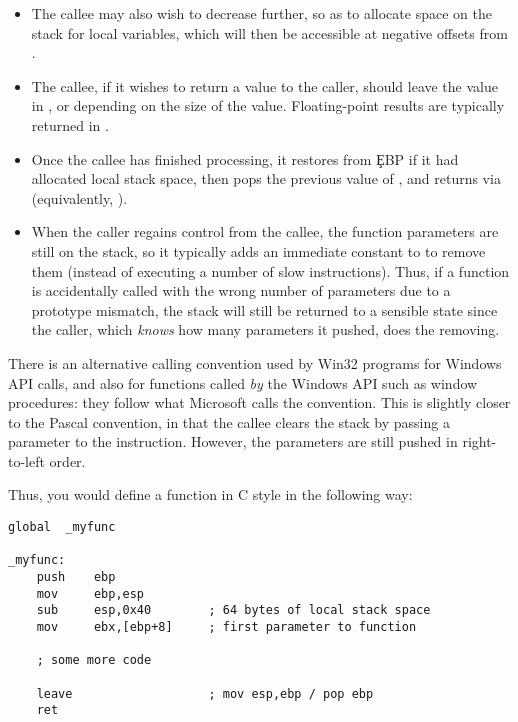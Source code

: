 \begin{itemize}
    \item{The callee may also wish to decrease  further, so as
        to allocate space on the stack for local variables, which will
        then be accessible at negative offsets from .}

    \item{The callee, if it wishes to return a value to the caller,
        should leave the value in ,  or 
        depending on the size of the value. Floating-point results
        are typically returned in .}

    \item{Once the callee has finished processing, it restores 
         from \c{EBP} if it had allocated local stack space,
        then pops the previous value of , and returns via
         (equivalently, ).}

    \item{When the caller regains control from the callee, the function
        parameters are still on the stack, so it typically adds an
        immediate constant to  to remove them (instead of
        executing a number of slow  instructions). Thus,
        if a function is accidentally called with the wrong number
        of parameters due to a prototype mismatch, the stack will
        still be returned to a sensible state since the caller, which
        \emph{knows} how many parameters it pushed, does the
        removing.}
\end{itemize}

There is an alternative calling convention used by Win32 programs
for Windows API calls, and also for functions called \emph{by} the
Windows API such as window procedures: they follow what Microsoft
calls the  convention. This is slightly closer to the
Pascal convention, in that the callee clears the stack by passing a
parameter to the  instruction. However, the parameters are
still pushed in right-to-left order.

Thus, you would define a function in C style in the following way:

\begin{lstlisting}
global  _myfunc

_myfunc:
    push    ebp
    mov     ebp,esp
    sub     esp,0x40        ; 64 bytes of local stack space
    mov     ebx,[ebp+8]     ; first parameter to function

    ; some more code

    leave                   ; mov esp,ebp / pop ebp
    ret
\end{lstlisting}

